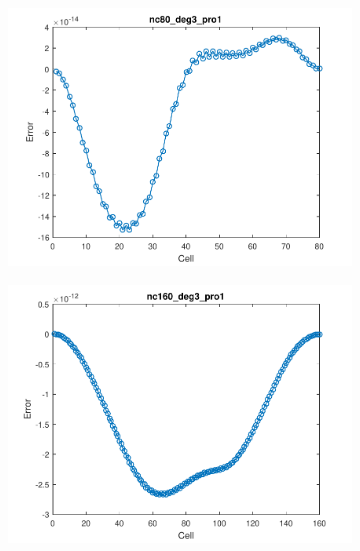 \documentclass[11pt,a4paper]{article}
\theoremstyle{plain}
\theoremstyle{definition}
\begin{document}
\begin{figure}[H]
\medskip
\begin{subfigure}[b]{0.48\textwidth}
\includegraphics[width=\linewidth]{../../tests_01_01/test_01_01_test47_pro1/output/plots/nc80_deg3_wei111_pro1.pdf}
\end{subfigure}\hspace*{\fill}
\begin{subfigure}[b]{0.48\textwidth}
\includegraphics[width=\linewidth]{../../tests_01_01/test_01_01_test47_pro1/output/plots/nc160_deg3_wei111_pro1.pdf}
\end{subfigure}


\end{figure}
\end{document}
